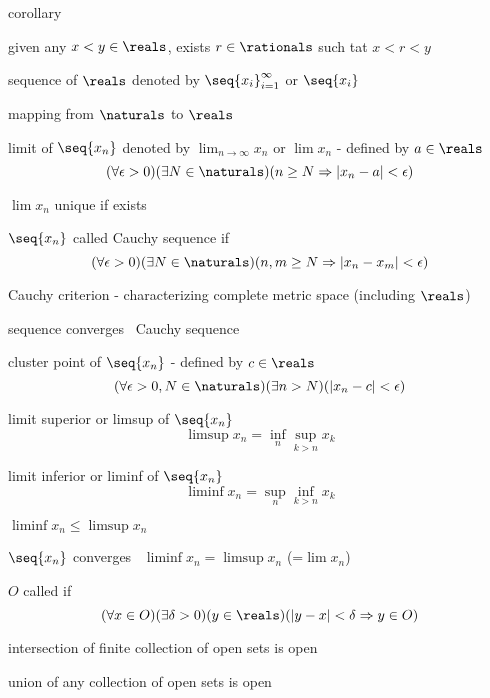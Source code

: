 \documentclass[17pt,landscape]{foils}
\begin{document}
{	\vitem [$\Rightarrow$] corollary
	\bit
		\item given any $x<y \in \reals$, exists $r\in\rationals$ such tat
		$
			x < r < y
		$
	\eit
\eit



\bit
	\item sequence of $\reals$ denoted by $\seq{x_i}_{i=1}^\infty$ or $\seq{x_i}$
	\bit
		\item mapping from $\naturals$ to $\reals$
	\eit

	\vitem limit of $\seq{x_n}$ denoted by $\lim_{n\to\infty} x_n$ or $\lim x_n$ - defined by $a\in\reals$
		\[
			(\forall \epsilon>0)(\exists N\in\naturals) (n \geq N \Rightarrow |x_n-a|<\epsilon)
		\]
	\bit
		\item $\lim x_n$ unique if exists
	\eit

	\vitem $\seq{x_n}$ called Cauchy sequence if
		\[
			(\forall \epsilon>0)(\exists N\in\naturals) (n,m \geq N \Rightarrow |x_n-x_m|<\epsilon)
		\]

	\vitem Cauchy criterion - characterizing complete metric space (including $\reals$)%
	\bit
		\item sequence converges \iaoi\ Cauchy sequence
	\eit
	\eit



	\bit
		\item cluster point of $\seq{x_n}$ - defined by $c\in\reals$
		\[
			(\forall \epsilon>0, N\in\naturals)(\exists n>N)(|x_n-c|<\epsilon)
		\]

		\vitem limit superior or limsup of $\seq{x_n}$
		\[
			\limsup x_n = \inf_n \sup_{k>n} x_k
		\]

		\vitem limit inferior or liminf of $\seq{x_n}$
		\[
			\liminf x_n = \sup_n \inf_{k>n} x_k
		\]

		\vvitem $\liminf x_n \leq \limsup x_n$

		\vitem $\seq{x_n}$ converges \iaoi\ $\liminf x_n = \limsup x_n$ (=$\lim x_n$)
	\eit



\bit
	\item $O$ called  if
	\[
		(\forall x\in O)(\exists \delta>0)(y\in\reals)(|y-x|<\delta\Rightarrow y\in O)
	\]
	\bit
		\item intersection of finite collection of open sets is open
		\item union of any collection of open sets is open
	\eit

}
\end{document}
